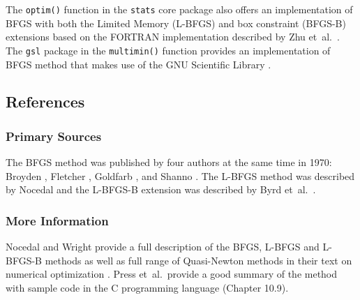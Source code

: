 The \texttt{optim()} function in the \texttt{stats} core package also offers an implementation of BFGS with both the Limited Memory (L-BFGS) and box constraint (BFGS-B) extensions based on the FORTRAN implementation described by Zhu et~al.\ \cite{Zhu1997}. The \texttt{gsl} package in the \texttt{multimin()} function provides an implementation of BFGS method that makes use of the GNU Scientific Library \cite{Hankin2011}.

\subsection{References}

\subsubsection{Primary Sources}
The BFGS method was published by four authors at the same time in 1970: Broyden \cite{Broyden1970}, Fletcher \cite{Fletcher1970}, Goldfarb \cite{Goldfarb1970}, and Shanno \cite{Shanno1970}.
The L-BFGS method was described by Nocedal \cite{Nocedal1980} and the L-BFGS-B extension was described by Byrd et~al.\ \cite{Byrd1995}.

\subsubsection{More Information}
Nocedal and Wright provide a full description of the BFGS, L-BFGS and L-BFGS-B methods as well as full range of Quasi-Newton methods in their text on numerical optimization \cite{Nocedal1999}.
Press et~al.\ provide a good summary of the method with sample code in the C programming language \cite{Press2007} (Chapter 10.9).



